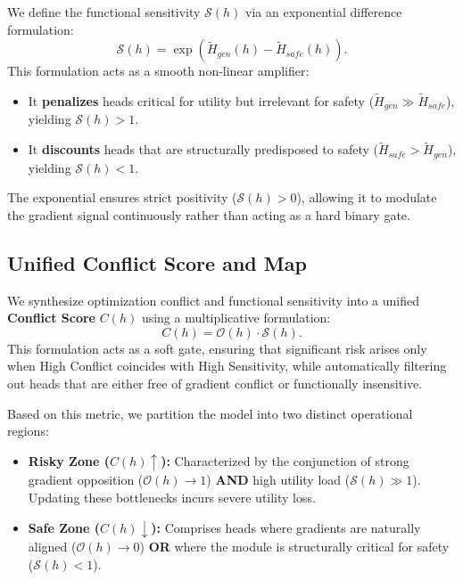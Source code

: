 \documentclass[11pt]{article}
\begin{document}
We define the functional sensitivity $\mathcal{S}(h)$ via an exponential difference formulation:
\begin{equation}
    \mathcal{S}(h) = \exp\left( \tilde H_{gen}(h) - \tilde H_{safe}(h) \right).
\end{equation}
This formulation acts as a smooth non-linear amplifier:
\begin{itemize}[leftmargin=*,itemsep=2pt, topsep=0pt, parsep=0pt]
    \item It \textbf{penalizes} heads critical for utility but irrelevant for safety ($\tilde H_{gen} \gg \tilde H_{safe}$), yielding $\mathcal{S}(h) > 1$.
    \item It \textbf{discounts} heads that are structurally predisposed to safety ($\tilde H_{safe} > \tilde H_{gen}$), yielding $\mathcal{S}(h) < 1$.
\end{itemize}
The exponential ensures strict positivity ($\mathcal{S}(h) > 0$), allowing it to modulate the gradient signal continuously rather than acting as a hard binary gate.

\subsection{Unified Conflict Score and Map}
We synthesize optimization conflict and functional sensitivity into a unified \textbf{Conflict Score} $C(h)$ using a multiplicative formulation:
\begin{equation}
    C(h) = \mathcal{O}(h) \cdot \mathcal{S}(h).
\end{equation}
This formulation acts as a soft gate, ensuring that significant risk arises only when High Conflict coincides with High Sensitivity, while automatically filtering out heads that are either free of gradient conflict or functionally insensitive.

Based on this metric, we partition the model into two distinct operational regions:
\begin{itemize}[leftmargin=*,itemsep=2pt, topsep=2pt, parsep=0pt]
    \item \textbf{Risky Zone ($C(h) \uparrow$):} Characterized by the conjunction of strong gradient opposition ($\mathcal{O}(h) \to 1$) \textbf{AND} high utility load ($\mathcal{S}(h) \gg 1$). Updating these bottlenecks incurs severe utility loss.
    \item \textbf{Safe Zone ($C(h) \downarrow$):} Comprises heads where gradients are naturally aligned ($\mathcal{O}(h) \to 0$) \textbf{OR} where the module is structurally critical for safety ($\mathcal{S}(h) < 1$).
\end{itemize}
\end{document}
